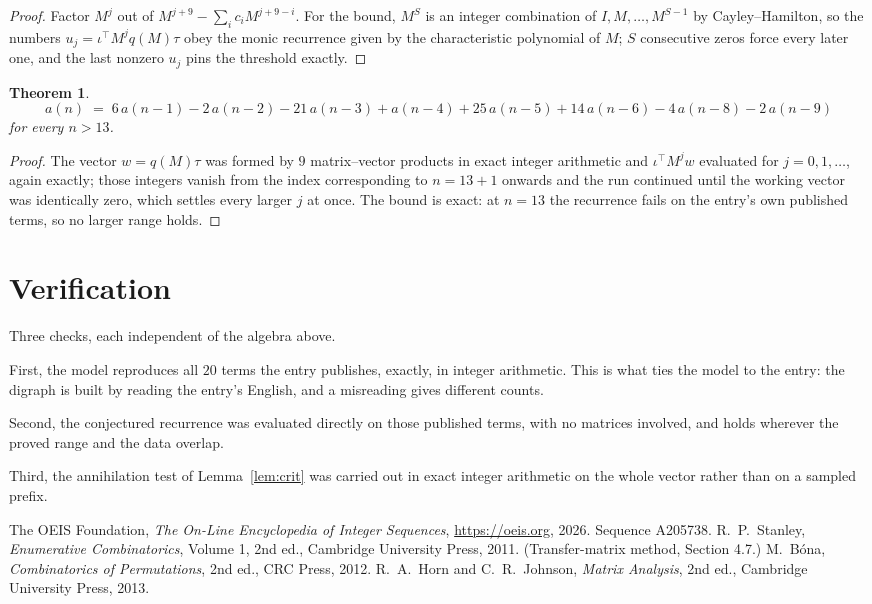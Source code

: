 \documentclass[11pt,a4paper]{article}
\theoremstyle{plain}
\newtheorem{theorem}{Theorem}
\theoremstyle{definition}
\begin{document}
\begin{proof}
Factor $M^{j}$ out of $M^{j+9}-\sum_ic_iM^{j+9-i}$. For the bound, $M^{S}$
is an integer combination of $I,M,\dots,M^{S-1}$ by Cayley--Hamilton, so the numbers
$u_j=\iota^{\!\top}M^{j}q(M)\tau$ obey the monic recurrence given by the characteristic
polynomial of $M$; $S$ consecutive zeros force every later one, and the last nonzero $u_j$
pins the threshold exactly.
\end{proof}

\begin{theorem}
\[
a(n)\;=\;6\,a(n-1) - 2\,a(n-2) - 21\,a(n-3) + a(n-4) + 25\,a(n-5) + 14\,a(n-6) - 4\,a(n-8) - 2\,a(n-9)
\]
for every $n>13$.
\end{theorem}

\begin{proof}
The vector $w=q(M)\tau$ was formed by $9$ matrix--vector products in exact integer
arithmetic and $\iota^{\!\top}M^{j}w$ evaluated for $j=0,1,\dots$, again exactly; those
integers vanish from the index corresponding to $n=13+1$ onwards and the run continued
until the working vector was identically zero, which settles every larger $j$ at once. The bound is exact: at $n=13$ the recurrence fails on the entry's own published terms, so no larger range holds.
\end{proof}

\section{Verification}

Three checks, each independent of the algebra above.

First, the model reproduces all $20$ terms the entry publishes, exactly, in integer
arithmetic. This is what ties the model to the entry: the digraph is built by reading the
entry's English, and a misreading gives different counts.

Second, the conjectured recurrence was evaluated directly on those published terms, with no
matrices involved, and holds wherever the proved range and the data overlap.

Third, the annihilation test of Lemma~\ref{lem:crit} was carried out in exact integer
arithmetic on the whole vector rather than on a sampled prefix.

\begin{thebibliography}{9}
 The OEIS Foundation, \emph{The On-Line Encyclopedia of Integer
Sequences}, \url{https://oeis.org}, 2026. Sequence A205738.
 R.~P.~Stanley, \emph{Enumerative Combinatorics}, Volume 1, 2nd ed.,
Cambridge University Press, 2011. (Transfer-matrix method, Section 4.7.)
 M.~B\'ona, \emph{Combinatorics of Permutations}, 2nd ed., CRC
Press, 2012.
 R.~A.~Horn and C.~R.~Johnson, \emph{Matrix Analysis}, 2nd ed., Cambridge
University Press, 2013.
\end{thebibliography}
\end{document}
